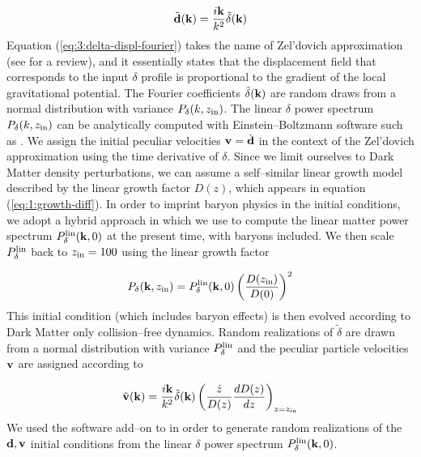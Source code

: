\begin{equation}
\label{eq:3:delta-displ-fourier}
\tilde{\mathbf{d}}(\mathbf{k}) = \frac{i\mathbf{k}}{k^2}\tilde{\delta}(\mathbf{k})
\end{equation}
%
Equation (\ref{eq:3:delta-displ-fourier}) takes the name of Zel'dovich approximation (see \citep{ZeldovichWhite} for a review), and it essentially states that the displacement field that corresponds to the input $\delta$ profile is proportional to the gradient of the local gravitational potential. The Fourier coefficients $\tilde{\delta}(\mathbf{k})$ are random draws from a normal distribution with variance $P_\delta(k,z_{\rm in})$. The linear $\delta$ power spectrum $P_\delta(k,z_{\rm in})$ can be analytically computed with Einstein--Boltzmann software such as  \citep{CAMB}. We assign the initial peculiar velocities $\mathbf{v}=\dot{\mathbf{d}}$ in the context of the Zel'dovich approximation using the time derivative of $\delta$. Since we limit ourselves to Dark Matter density perturbations, we can assume a self--similar linear growth model described by the linear growth factor $D(z)$, which appears in equation (\ref{eq:1:growth-diff}). In order to imprint baryon physics in the initial conditions, we adopt a hybrid approach in which we use  to compute the linear matter power spectrum $P^{\rm lin}_\delta(\mathbf{k},0)$ at the present time, with baryons included. We then scale $P^{\rm lin}_\delta$ back to $z_{\rm in}=100$ using the linear growth factor

\begin{equation}
\label{eq:3:hybrid-power}
P_\delta(\mathbf{k},z_{\rm in}) = P^{\rm lin}_\delta(\mathbf{k},0)\left(\frac{D(z_{\rm in})}{D(0)}\right)^2 
\end{equation}
%
This initial condition (which includes baryon effects) is then evolved according to Dark Matter only collision--free dynamics. Random realizations of $\tilde{\delta}$ are drawn from a normal distribution with variance $P_\delta^{\rm lin}$ and the peculiar particle velocities $\mathbf{v}$ are assigned according to 

\begin{equation}
\label{eq:3:peculiar-initv}
\tilde{\mathbf{v}}(\mathbf{k}) = \frac{i\mathbf{k}}{k^2}\tilde{\delta}(\mathbf{k})\left(\frac{\dot{z}}{D(z)}\frac{dD(z)}{dz}\right)_{z=z_{\rm in}}
\end{equation}  
%
We used the  software add--on to  \citep{gadget2} in order to generate random realizations of the $\mathbf{d},\mathbf{v}$ initial conditions from the linear $\delta$ power spectrum $P^{\rm lin}_\delta(\mathbf{k},0)$.   

